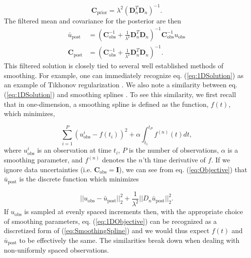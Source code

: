 \documentclass[10pt,a4paper]{article}
\begin{document}
\begin{equation}\label{eq:ExplicitPrior1D}
\mathbf{C_\mathrm{prior}} = \lambda^2(\mathbf{D}_n^T\mathbf{D}_n)^{-1}.
\end{equation}
The filtered mean and covariance for the posterior are then 
\begin{equation}\label{eq:1DSolution}
\begin{split}
\bar{u}_\mathrm{post} &= (\mathbf{C}_\mathrm{obs}^{-1} +   
                   \frac{1}{\lambda^2}\mathbf{D}_n^T\mathbf{D}_n)^{-1}\mathbf{C}_\mathrm{obs}^{-1}
                   u_\mathrm{obs}
\\
\mathbf{C}_\mathrm{post} &= (\mathbf{C}_\mathrm{obs}^{-1} +   
                            \frac{1}{\lambda^2}\mathbf{D}_n^T\mathbf{D}_n)^{-1}.
\end{split}
\end{equation}
This filtered solution is closely tied to several well established methods of smoothing.  For example, one can immediately recognize eq. (\ref{eq:1DSolution}) as an example of Tikhonov regularization \citep{Tikhonov1978}. We also note a similarity between eq. (\ref{eq:1DSolution}) and smoothing splines \citep{Wahba1990}.  To see this similarity, we first recall that in one-dimension, a smoothing spline is defined as the function, $f(t)$, which minimizes,

\begin{equation}\label{eq:SmoothingSpline}
\sum_{i=1}^P (u_\mathrm{obs}^i - f(t_i))^2 + \alpha \int_{t_1}^{t_P} f^{(n)}(t) dt,
\end{equation}
where $u_\mathrm{obs}^i$ is an observation at time $t_i$, $P$ is the number of observations, $\alpha$ is a smoothing parameter, and $f^{(n)}$ denotes the $n$'th time derivative of $f$.
If we ignore data uncertainties (i.e. $\mathbf{C}_\mathrm{obs}=\mathbf{I}$), we can see from eq. (\ref{eq:Objective}) that $\bar{u}_\mathrm{post}$ is the discrete function which minimizes  

\begin{equation}\label{eq:1DObjective}
||u_\mathrm{obs} - \bar{u}_\mathrm{post}||_2^2 + \frac{1}{\lambda^2}||D_n\bar{u}_\mathrm{post}||_2^2.
\end{equation} 
If $u_\mathrm{obs}$ is sampled at evenly spaced increments then, with the appropriate choice of smoothing parameters, eq. (\ref{eq:1DObjective}) can be recognized as a discretized form of (\ref{eq:SmoothingSpline}) and we would thus expect $f(t)$ and $\bar{u}_\mathrm{post}$ to be effectively the same. The similarities break down when dealing with non-uniformly spaced observations.  
\end{document}
